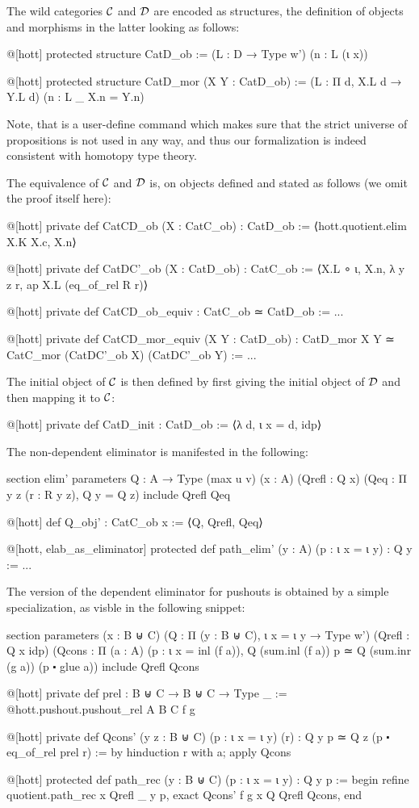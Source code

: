 The wild categories $\mathcal C$ and $\mathcal D$ are encoded as structures, the definition
of objects and morphisms in the latter looking as follows:
\begin{leancode}
@[hott] protected structure CatD_ob :=
  (L : D → Type w')
  (n : L (ι x))

@[hott] protected structure CatD_mor (X Y : CatD_ob) :=
  (L : Π d, X.L d → Y.L d)
  (n : L _ X.n = Y.n)
\end{leancode}
Note, that  is a user-define command which makes sure that the
strict universe of propositions is not used in any way, and thus our
formalization is indeed consistent with homotopy type theory.

The equivalence of $\mathcal C$ and $\mathcal D$ is, on objects defined and stated as
follows (we omit the proof itself here):
\begin{leancode}
@[hott] private def CatCD_ob (X : CatC_ob) : CatD_ob :=
⟨hott.quotient.elim X.K X.c, X.n⟩

@[hott] private def CatDC'_ob (X : CatD_ob) : CatC_ob :=
⟨X.L ∘ ι, X.n, λ y z r, ap X.L (eq_of_rel R r)⟩

@[hott] private def CatCD_ob_equiv : CatC_ob ≃ CatD_ob := ...

@[hott] private def CatCD_mor_equiv (X Y : CatD_ob)
  : CatD_mor X Y ≃ CatC_mor (CatDC'_ob X) (CatDC'_ob Y) := ...
\end{leancode}
The initial object of $\mathcal C$ is then defined by first giving the initial
object of $\mathcal D$ and then mapping it to $\mathcal C$:
\begin{leancode}
@[hott] private def CatD_init : CatD_ob := ⟨λ d, ι x = d, idp⟩
\end{leancode}

The non-dependent eliminator is manifested in the following:
\begin{leancode}
section elim'
parameters {Q : A → Type (max u v)}
  (x : A)
  (Qrefl : Q x)
  (Qeq : Π y z (r : R y z), Q y = Q z)
include Qrefl Qeq

@[hott] def Q_obj' : CatC_ob x := ⟨Q, Qrefl, Qeq⟩

@[hott, elab_as_eliminator] protected def path_elim' (y : A) (p : ι x = ι y)
  : Q y := ...
\end{leancode}

The version of the dependent eliminator for pushouts is obtained by a simple
specialization, as visble in the following snippet:
\begin{leancodebr}
section
  parameters (x : B ⊎ C)
    (Q : Π (y : B ⊎ C), ι x = ι y →  Type w')
    (Qrefl : Q x idp)
    (Qcons : Π (a : A) (p : ι x = inl (f a)), 
      Q (sum.inl (f a)) p ≃ Q (sum.inr (g a)) (p ⬝ glue a))
  include Qrefl Qcons

@[hott] private def prel : B ⊎ C → B ⊎ C → Type _ := 
@hott.pushout.pushout_rel A B C f g

@[hott] private def Qcons' (y z : B ⊎ C) (p : ι x = ι y) (r)
  : Q y p ≃ Q z (p ⬝ eq_of_rel prel r) :=
by { hinduction r with a; apply Qcons }

@[hott] protected def path_rec (y : B ⊎ C) (p : ι x = ι y) : Q y p :=
begin
  refine quotient.path_rec x Qrefl _ y p,
  exact Qcons' f g x Q Qrefl Qcons,
end
\end{leancodebr}

